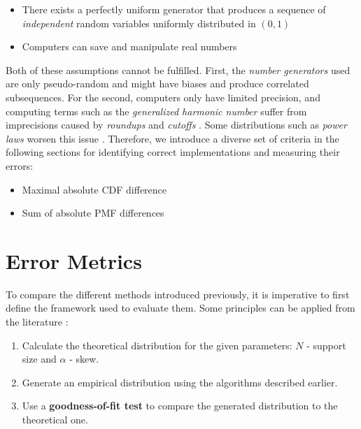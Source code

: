 \begin{itemize}
    \item There exists a perfectly uniform generator that produces a sequence of \textit{independent} random variables uniformly distributed in $(0,1)$
    \item Computers can save and manipulate real numbers
\end{itemize}

Both of these assumptions cannot be fulfilled. First, the \textit{number generators} used are only pseudo-random \cite{kuhlHistoryRandomVariate2017} and might
have biases and produce correlated subsequences. For the second, computers only have limited precision, and computing terms such as the \textit{generalized harmonic number} suffer from
imprecisions caused by \textit{roundups} and \textit{cutoffs} \cite{leydoldErrorDetectionNonUniforma}. Some distributions such as \textit{power laws} worsen this issue \cite{radicchiUnderestimatingExtremeEvents2014}. Therefore,
we introduce a diverse set of criteria in the following sections for identifying correct implementations and measuring their errors:

\begin{itemize}
    \item Maximal absolute \ac{CDF} difference
    \item Sum of absolute \ac{PMF} differences
\end{itemize}

\section{Error Metrics}
To compare the different methods introduced previously, it is imperative to first define the framework used to evaluate them. Some principles can be applied from the literature
\cite{clausetPowerlawDistributionsEmpirical2009,leydoldErrorDetectionNonUniforma,monahanAccuracyRandomNumber1985}:

\begin{mdframed}
        \begin{enumerate}
            \item Calculate the theoretical distribution for the given parameters: $N$ - support size and $\alpha$ - skew.
            \item Generate an empirical distribution using the algorithms described earlier.
            \item Use a \textbf{goodness-of-fit test} to compare the generated distribution to the theoretical one.
        \end{enumerate}
        \label{box:accuracy}
\end{mdframed}

